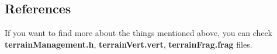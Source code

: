 \newpage

\begin{figure}[hbt!]
	\centering
	\qquad
	\caption{}
\end{figure}

\subsection{References}

If you want to find more about the things mentioned above, you can check \textbf{terrainManagement.h}, \textbf{terrainVert.vert}, \textbf{terrainFrag.frag} files.

\newpage